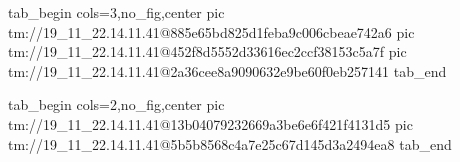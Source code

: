  
 
 
 
 

\qqSecCmtScr


\ifcmt
  tab_begin cols=3,no_fig,center
    pic tm://19_11_22.14.11.41@885e65bd825d1feba9c006cbeae742a6
    pic tm://19_11_22.14.11.41@452f8d5552d33616ec2ccf38153c5a7f
    pic tm://19_11_22.14.11.41@2a36cee8a9090632e9be60f0eb257141
  tab_end
\fi


\ifcmt
  tab_begin cols=2,no_fig,center
    pic tm://19_11_22.14.11.41@13b04079232669a3be6e6f421f4131d5
    pic tm://19_11_22.14.11.41@5b5b8568c4a7e25c67d145d3a2494ea8
  tab_end
\fi

